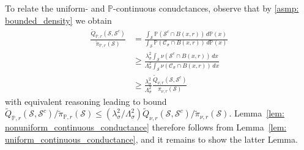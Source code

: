 \documentclass[11pt,twoside]{article}
\theoremstyle{definition}
\newcommand{\1}{\mathbbm{1}}
\newcommand{\Pbb}{\mathbb{P}}
\newcommand{\Sset}{\mathcal{S}}
\newcommand{\Cset}{\mathcal{C}}
\newcommand{\Csig}{\Cset_{\sigma}}
\newcommand{\dx}{\,dx}
\newcommand{\piwt}{\widetilde{\pi}}
\begin{document}
To relate the uniform- and $\Pbb$-continuous conudctances, observe that by \ref{asmp: bounded_density} we obtain
\begin{align*}
\frac{\widetilde{Q}_{\Pbb,r}(\Sset,\Sset^c)}{\piwt_{\Pbb,r}(\Sset)} & = \frac{\int_{\Sset} \Pbb(\Sset^c \cap B(x,r)) \,d\Pbb(x)}{\int_{\Sset} \Pbb(\Csig \cap B(x,r)) \,d\Pbb(x)} \\
& \geq \frac{\lambda_{\sigma}^2 \int_{\Sset} \nu(\Sset^c \cap B(x,r)) \dx}{\Lambda_{\sigma}^2 \int_{\Sset} \nu(\Csig \cap B(x,r)) \dx} \\
& \geq \frac{\lambda_{\sigma}^2}{\Lambda_{\sigma}^2} \frac{\widetilde{Q}_{\nu,r}(\Sset,\Sset^c)}{\pi_{\nu,r}(\Sset)}
\end{align*}
with equivalent reasoning leading to bound $\widetilde{Q}_{\Pbb,r}(\Sset,\Sset^c)/\piwt_{\Pbb,r}(\Sset) \leq (\lambda_{\sigma}^2/\Lambda_{\sigma}^2) \widetilde{Q}_{\nu,r}(\Sset,\Sset^c)/\piwt_{\nu,r}(\Sset)$. Lemma~\ref{lem: nonuniform_continuous_conductance} therefore follows from Lemma~\ref{lem: uniform_continuous_conductance}, and it remains to show the latter Lemma.
\end{document}
